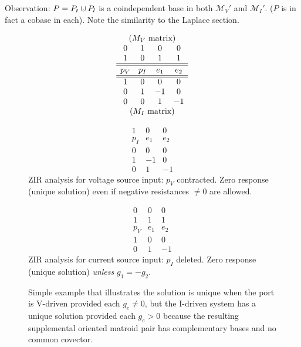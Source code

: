 \documentclass{amsproc-sunycstr}
\theoremstyle{plain}
\theoremstyle{definition}
\theoremstyle{remark}
\newcommand{\dunion}
{\mbox{\hbox{\hskip4pt$\cdot$\hskip-4.62pt$\cup$\hskip2pt}}}
\newcommand{\extra}[1]{{{#1}}}
\begin{document}
Observation:  $P=P_t\dunion P_l$ is a coindependent base in both
${\mathcal{M}_V}'$ and ${\mathcal{M}_I}'$.  ($P$ is in fact a cobase in each).
Note the similarity to the Laplace section.



\extra{
\begin{figure}[htb]

\begin{minipage}[c]{.48\linewidth}
  \centering
 \centerline{}
\end{minipage}
%
\hfill
\begin{minipage}[c]{.48\linewidth}
\[
\begin{array}{cccc}
\multicolumn{4}{c}{\mbox{($M_V$ matrix)}} \\
0   &  1  &  0  &  0  \\
1   &  0  &  1  &  1  \\ \hline \hline
p_V & p_I & e_1 & e_2 \\ \hline \hline
1   &  0  &  0  &  0  \\
0   &  1  & -1  &  0  \\
0   &  0  &  1  &  -1 \\
\multicolumn{4}{c}{\mbox{($M_I$ matrix)}} \\
\end{array}
\]
\end{minipage}
%
\begin{minipage}[b]{.48\linewidth}
\[
\begin{array}{ccc}
  1  &  0  &  0  \\ \hline
 p_I & e_1 & e_2 \\ \hline
  0  &  0  &  0  \\
  1  & -1  &  0  \\
  0  &  1  &  -1
\end{array}
\]
ZIR analysis for voltage source input:
$p_V$ contracted.  Zero response (unique solution) even if
negative resistances $\neq 0$ are allowed.
\end{minipage}
\hfill
\begin{minipage}[b]{.48\linewidth}
\[
\begin{array}{ccc}
0   &  0  &  0  \\
1   &  1  &  1  \\ \hline
p_V & e_1 & e_2 \\ \hline
1   &  0  &  0  \\
0   &  1  &  -1
\end{array}
\]
ZIR analysis for current source input:
$p_I$ deleted.
Zero response (unique solution) \textit{unless}
$g_1 = -g_2$.  
\end{minipage}
\caption{Simple example that illustrates the solution is unique when the 
port is V-driven provided each $g_e\neq 0$, but the I-driven system has a
unique solution provided each $g_e>0$ because the resulting supplemental
oriented matroid pair has complementary bases and no common covector.}
\label{Simple}
%
\end{figure}
}
\end{document}
